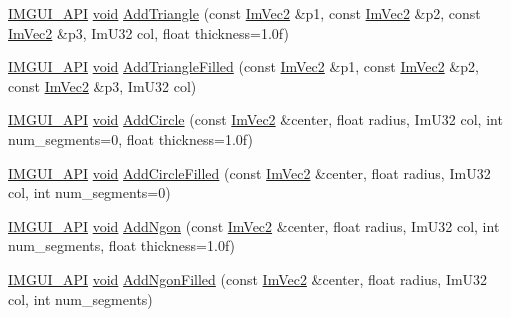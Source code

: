 \begin{DoxyCompactItemize}
\item 
\hyperlink{imgui_8h_a43829975e84e45d1149597467a14bbf5}{I\+M\+G\+U\+I\+\_\+\+A\+PI} \hyperlink{imgui__impl__opengl3__loader_8h_ac668e7cffd9e2e9cfee428b9b2f34fa7}{void} \hyperlink{structImDrawList_a04bde432891d0392e7d98d957c1fd9b3}{Add\+Triangle} (const \hyperlink{structImVec2}{Im\+Vec2} \&p1, const \hyperlink{structImVec2}{Im\+Vec2} \&p2, const \hyperlink{structImVec2}{Im\+Vec2} \&p3, Im\+U32 col, float thickness=1.\+0f)
\item 
\hyperlink{imgui_8h_a43829975e84e45d1149597467a14bbf5}{I\+M\+G\+U\+I\+\_\+\+A\+PI} \hyperlink{imgui__impl__opengl3__loader_8h_ac668e7cffd9e2e9cfee428b9b2f34fa7}{void} \hyperlink{structImDrawList_af1dd4a3888034c5f71b66a38e44edf31}{Add\+Triangle\+Filled} (const \hyperlink{structImVec2}{Im\+Vec2} \&p1, const \hyperlink{structImVec2}{Im\+Vec2} \&p2, const \hyperlink{structImVec2}{Im\+Vec2} \&p3, Im\+U32 col)
\item 
\hyperlink{imgui_8h_a43829975e84e45d1149597467a14bbf5}{I\+M\+G\+U\+I\+\_\+\+A\+PI} \hyperlink{imgui__impl__opengl3__loader_8h_ac668e7cffd9e2e9cfee428b9b2f34fa7}{void} \hyperlink{structImDrawList_a9b73eea0ebf7a9f02bc8a104deb7de9d}{Add\+Circle} (const \hyperlink{structImVec2}{Im\+Vec2} \&center, float radius, Im\+U32 col, int num\+\_\+segments=0, float thickness=1.\+0f)
\item 
\hyperlink{imgui_8h_a43829975e84e45d1149597467a14bbf5}{I\+M\+G\+U\+I\+\_\+\+A\+PI} \hyperlink{imgui__impl__opengl3__loader_8h_ac668e7cffd9e2e9cfee428b9b2f34fa7}{void} \hyperlink{structImDrawList_aef950cf8b0293b2c5e4708af72de045b}{Add\+Circle\+Filled} (const \hyperlink{structImVec2}{Im\+Vec2} \&center, float radius, Im\+U32 col, int num\+\_\+segments=0)
\item 
\hyperlink{imgui_8h_a43829975e84e45d1149597467a14bbf5}{I\+M\+G\+U\+I\+\_\+\+A\+PI} \hyperlink{imgui__impl__opengl3__loader_8h_ac668e7cffd9e2e9cfee428b9b2f34fa7}{void} \hyperlink{structImDrawList_abd004dec93d106eb867c9c6554d85989}{Add\+Ngon} (const \hyperlink{structImVec2}{Im\+Vec2} \&center, float radius, Im\+U32 col, int num\+\_\+segments, float thickness=1.\+0f)
\item 
\hyperlink{imgui_8h_a43829975e84e45d1149597467a14bbf5}{I\+M\+G\+U\+I\+\_\+\+A\+PI} \hyperlink{imgui__impl__opengl3__loader_8h_ac668e7cffd9e2e9cfee428b9b2f34fa7}{void} \hyperlink{structImDrawList_a75bf382ddc70429f82a570c2782c4491}{Add\+Ngon\+Filled} (const \hyperlink{structImVec2}{Im\+Vec2} \&center, float radius, Im\+U32 col, int num\+\_\+segments)
\item 

\end{DoxyCompactItemize}
